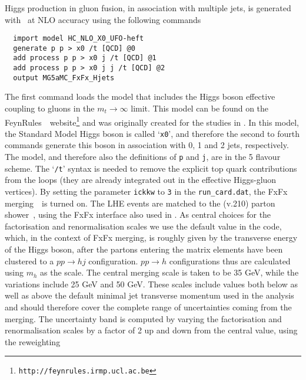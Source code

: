 \subsubsection{\MGaMC}
\label{sec:hjetscomp:tools:mc:mgamc}

Higgs production in gluon fusion, in association with multiple jets,
is generated with \MGaMC \cite{Alwall:2014hca}~at NLO
accuracy using the following commands
\begin{verbatim}
  import model HC_NLO_X0_UFO-heft
  generate p p > x0 /t [QCD] @0
  add process p p > x0 j /t [QCD] @1
  add process p p > x0 j j /t [QCD] @2
  output MG5aMC_FxFx_Hjets
\end{verbatim}
The first command loads the model that includes the Higgs boson
effective coupling to gluons in the $m_t\to\infty$ limit. This model
can be found on the
FeynRules~\cite{Alloul:2013bka}~website\footnote{\texttt{http://feynrules.irmp.ucl.ac.be}}
and was originally created for the studies in
\cite{Demartin:2014fia}. In this model, the Standard Model Higgs
boson is called `\texttt{x0}', and therefore the second to fourth
commands generate this boson in association with 0, 1 and 2 jets,
respectively. The model, and therefore also the definitions of
\texttt{p} and \texttt{j}, are in the 5 flavour scheme. The
`\texttt{/t}' syntax is needed to remove the explicit top quark
contributions from the loops (they are already integrated out in the
effective Higgs-gluon vertices). By setting the parameter
\texttt{ickkw} to \texttt{3} in the \texttt{run\_card.dat}, the FxFx
merging~\cite{Frederix:2012ps}~is turned on. The LHE events are
matched to the  (v.210) parton
shower~\cite{Sjostrand:2014zea}, using the FxFx interface also used in
\cite{Frederix:2015eii}. As central choices for the factorisation
and renormalisation scales we use the default value in the
\MGaMC code, which, in the context of FxFx merging, is
roughly given by the transverse energy of the Higgs boson, after the
partons entering the matrix elements have been clustered to a $pp \to h
j$ configuration. $pp\to h$ configurations thus are calculated using 
$m_h$ as the scale. The central merging scale is taken to be 35 GeV,
while the variations include 25 GeV and 50 GeV. These scales include 
values both below as well as above the default minimal jet transverse
momentum used in the analysis and should therefore cover the complete
range of uncertainties coming from the merging.  The uncertainty band
is computed by varying the factorisation and renormalisation scales by
a factor of 2 up and down from the central value, using the reweighting
